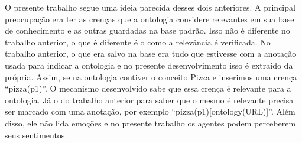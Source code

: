 O presente trabalho segue uma ideia parecida desses dois anteriores. A
principal preocupação era ter as crenças que a ontologia considere relevantes
em sua base de conhecimento e as outras guardadas na base padrão. Isso não é
diferente no trabalho anterior, o que é diferente é o como a relevância é
verificada. No trabalho anterior, o que era salvo na base era tudo que estivesse com a
anotação usada para indicar a ontologia e no presente desenvolvimento isso é
extraído da própria. Assim, se na ontologia contiver
o conceito Pizza e inserimos uma crença ``pizza(p1)''. O mecanismo
desenvolvido sabe que essa crença é relevante para a ontologia. Já o do
trabalho anterior para saber que o mesmo é relevante precisa ser marcado
com uma anotação, por exemplo ``pizza(p1)[ontology(URL)]''. Além disso, ele
não lida emoções e no presente trabalho os agentes podem perceberem seus
sentimentos.

